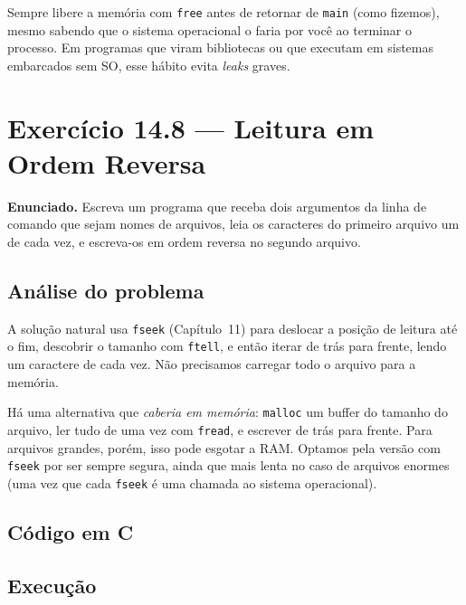 \documentclass[11pt,a4paper]{article}
\begin{document}
\begin{boaprat}
Sempre libere a mem\'oria com \texttt{free} antes de retornar de \texttt{main} (como fizemos), mesmo sabendo que o sistema operacional o faria por voc\^e ao terminar o processo. Em programas que viram bibliotecas ou que executam em sistemas embarcados sem SO, esse h\'abito evita \emph{leaks} graves.
\end{boaprat}

\newpage
\section{Exerc\'icio 14.8 --- Leitura em Ordem Reversa}

\begin{enunciado}
\textbf{Enunciado.} Escreva um programa que receba dois argumentos da linha de comando que sejam nomes de arquivos, leia os caracteres do primeiro arquivo um de cada vez, e escreva-os em ordem reversa no segundo arquivo.
\end{enunciado}

\subsection*{An\'alise do problema}

A solu\c{c}\~ao natural usa \texttt{fseek} (Cap\'itulo~11) para deslocar a posi\c{c}\~ao de leitura at\'e o fim, descobrir o tamanho com \texttt{ftell}, e ent\~ao iterar de tr\'as para frente, lendo um caractere de cada vez. N\~ao precisamos carregar todo o arquivo para a mem\'oria.

H\'a uma alternativa que \emph{caberia em mem\'oria}: \texttt{malloc} um buffer do tamanho do arquivo, ler tudo de uma vez com \texttt{fread}, e escrever de tr\'as para frente. Para arquivos grandes, por\'em, isso pode esgotar a RAM. Optamos pela vers\~ao com \texttt{fseek} por ser sempre segura, ainda que mais lenta no caso de arquivos enormes (uma vez que cada \texttt{fseek} \'e uma chamada ao sistema operacional).

\subsection*{C\'odigo em C}



\subsection*{Execu\c{c}\~ao}
\end{document}
